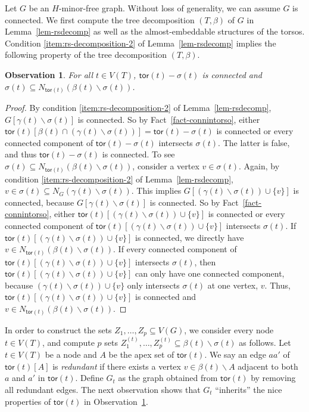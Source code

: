 \documentclass[a4paper,11pt]{article}
\numberwithin{lemma}{section}
\newtheorem{observation}[lemma]{Observation}
\newcommand{\tor}{\mathsf{tor}}
\begin{document}
Let $G$ be an $H$-minor-free graph.
Without loss of generality, we can assume $G$ is connected.
We first compute the tree decomposition $(T,\beta)$ of $G$ in Lemma~\ref{lem-rsdecomp} as well as the almost-embeddable structures of the torsos.
Condition \ref{item:rs-decomposition-2} of Lemma~\ref{lem-rsdecomp} implies the following property of the tree decomposition $(T,\beta)$.

\begin{observation} \label{obs-noadhtos}
For all $t \in V(T)$, $\tor(t) - \sigma(t)$ is connected and $\sigma(t) \subseteq N_{\tor(t)}(\beta(t) \backslash \sigma(t))$.
\end{observation}
\begin{proof}
By condition \ref{item:rs-decomposition-2} of Lemma~\ref{lem-rsdecomp}, $G[\gamma(t) \backslash \sigma(t)]$ is connected.
So by Fact~\ref{fact-connintorso}, either $\tor(t)[\beta(t) \cap (\gamma(t) \backslash \sigma(t))] = \tor(t) - \sigma(t)$ is connected or every connected component of $\tor(t) - \sigma(t)$ intersects $\sigma(t)$.
The latter is false, and thus $\tor(t) - \sigma(t)$ is connected.
To see $\sigma(t) \subseteq N_{\tor(t)}(\beta(t) \backslash \sigma(t))$, consider a vertex $v \in \sigma(t)$.
Again, by condition \ref{item:rs-decomposition-2} of Lemma~\ref{lem-rsdecomp}, $v \in \sigma(t) \subseteq N_G(\gamma(t) \backslash \sigma(t))$.
This implies $G[(\gamma(t) \backslash \sigma(t)) \cup \{v\}]$ is connected, because $G[\gamma(t) \backslash \sigma(t)]$ is connected.
So by Fact~\ref{fact-connintorso}, either $\tor(t)[(\gamma(t) \backslash \sigma(t)) \cup \{v\}]$ is connected or every connected component of $\tor(t)[(\gamma(t) \backslash \sigma(t)) \cup \{v\}]$ intersects $\sigma(t)$.
If $\tor(t)[(\gamma(t) \backslash \sigma(t)) \cup \{v\}]$ is connected, we directly have $v \in N_{\tor(t)}(\beta(t) \backslash \sigma(t))$.
If every connected component of $\tor(t)[(\gamma(t) \backslash \sigma(t)) \cup \{v\}]$ intersects $\sigma(t)$, then $\tor(t)[(\gamma(t) \backslash \sigma(t)) \cup \{v\}]$ can only have one connected component, because $(\gamma(t) \backslash \sigma(t)) \cup \{v\}$ only intersects $\sigma(t)$ at one vertex, $v$.
Thus, $\tor(t)[(\gamma(t) \backslash \sigma(t)) \cup \{v\}]$ is connected and $v \in N_{\tor(t)}(\beta(t) \backslash \sigma(t))$.
\end{proof}

In order to construct the sets $Z_1,\dots,Z_p \subseteq V(G)$, we consider every node $t \in V(T)$, and compute $p$ sets $Z_1^{(t)},\dots,Z_p^{(t)} \subseteq \beta(t) \backslash \sigma(t)$ as follows.
Let $t \in V(T)$ be a node and $A$ be the apex set of $\tor(t)$.
We say an edge $aa'$ of $\tor(t)[A]$ is \textit{redundant} if there exists a vertex $v \in \beta(t) \backslash A$ adjacent to both $a$ and $a'$ in $\tor(t)$.
Define $G_t$ as the graph obtained from $\tor(t)$ by removing all redundant edges.
The next observation shows that $G_t$ ``inherits'' the nice properties of $\tor(t)$ in Observation~\ref{obs-noadhtos}.
\end{document}
